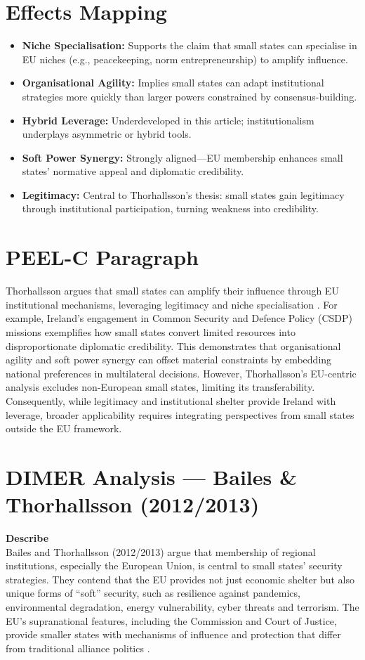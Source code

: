 \section*{Effects Mapping}
\begin{itemize}
	\item \textbf{Niche Specialisation:} Supports the claim that small states can specialise in EU niches (e.g., peacekeeping, norm entrepreneurship) to amplify influence.
	\item \textbf{Organisational Agility:} Implies small states can adapt institutional strategies more quickly than larger powers constrained by consensus-building.
	\item \textbf{Hybrid Leverage:} Underdeveloped in this article; institutionalism underplays asymmetric or hybrid tools.
	\item \textbf{Soft Power Synergy:} Strongly aligned—EU membership enhances small states’ normative appeal and diplomatic credibility.
	\item \textbf{Legitimacy:} Central to Thorhallsson’s thesis: small states gain legitimacy through institutional participation, turning weakness into credibility.
\end{itemize}

\section*{PEEL-C Paragraph}
Thorhallsson argues that small states can amplify their influence through EU institutional mechanisms, leveraging legitimacy and niche specialisation \parencite{}. For example, Ireland’s engagement in Common Security and Defence Policy (CSDP) missions exemplifies how small states convert limited resources into disproportionate diplomatic credibility. This demonstrates that organisational agility and soft power synergy can offset material constraints by embedding national preferences in multilateral decisions. However, Thorhallsson’s EU-centric analysis excludes non-European small states, limiting its transferability. Consequently, while legitimacy and institutional shelter provide Ireland with leverage, broader applicability requires integrating perspectives from small states outside the EU framework.

\section*{DIMER Analysis — Bailes \& Thorhallsson (2012/2013)}

\textbf{Describe} \\
Bailes and Thorhallsson (2012/2013) argue that membership of regional institutions, especially the European Union, is central to small states’ security strategies. They contend that the EU provides not just economic shelter but also unique forms of ``soft'' security, such as resilience against pandemics, environmental degradation, energy vulnerability, cyber threats and terrorism. The EU’s supranational features, including the Commission and Court of Justice, provide smaller states with mechanisms of influence and protection that differ from traditional alliance politics \parencite{BAILES_2012}.  

